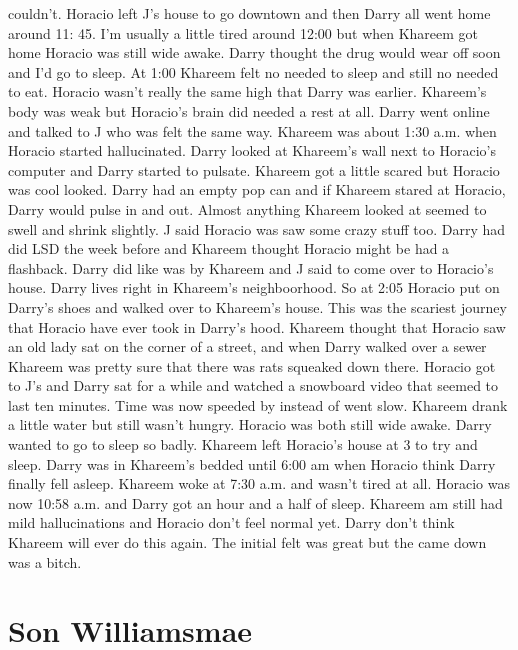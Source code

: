 \documentclass[12pt]{book}
\begin{document}
couldn't. Horacio left J's house to go downtown and then Darry all went home around 11: 45. I'm usually a little tired around 12:00 but when Khareem got home Horacio was still wide awake. Darry thought the drug would wear off soon and I'd go to sleep. At 1:00 Khareem felt no needed to sleep and still no needed to eat. Horacio wasn't really the same high that Darry was earlier. Khareem's body was weak but Horacio's brain did needed a rest at all. Darry went online and talked to J who was felt the same way. Khareem was about 1:30 a.m. when Horacio started hallucinated. Darry looked at Khareem's wall next to Horacio's computer and Darry started to pulsate. Khareem got a little scared but Horacio was cool looked. Darry had an empty pop can and if Khareem stared at Horacio, Darry would pulse in and out. Almost anything Khareem looked at seemed to swell and shrink slightly. J said Horacio was saw some crazy stuff too. Darry had did LSD the week before and Khareem thought Horacio might be had a flashback. Darry did like was by Khareem and J said to come over to Horacio's house. Darry lives right in Khareem's neighboorhood. So at 2:05 Horacio put on Darry's shoes and walked over to Khareem's house. This was the scariest journey that Horacio have ever took in Darry's hood. Khareem thought that Horacio saw an old lady sat on the corner of a street, and when Darry walked over a sewer Khareem was pretty sure that there was rats squeaked down there. Horacio got to J's and Darry sat for a while and watched a snowboard video that seemed to last ten minutes. Time was now speeded by instead of went slow. Khareem drank a little water but still wasn't hungry. Horacio was both still wide awake. Darry wanted to go to sleep so badly. Khareem left Horacio's house at 3 to try and sleep. Darry was in Khareem's bedded until 6:00 am when Horacio think Darry finally fell asleep. Khareem woke at 7:30 a.m. and wasn't tired at all. Horacio was now 10:58 a.m. and Darry got an hour and a half of sleep. Khareem am still had mild hallucinations and Horacio don't feel normal yet. Darry don't think Khareem will ever do this again. The initial felt was great but the came down was a bitch.



\chapter{Son Williamsmae}
\end{document}
